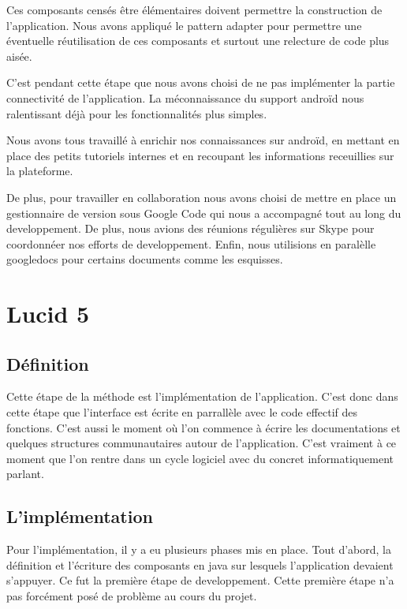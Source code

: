 \documentclass[11pt,a4paper]{article}
\begin{document}
Ces composants censés être élémentaires doivent permettre la construction de
l'application. Nous avons appliqué le pattern adapter pour permettre
une éventuelle réutilisation de ces composants et surtout une relecture de code
plus aisée.

C'est pendant cette étape que nous avons choisi de ne pas implémenter la partie
connectivité de l'application. La méconnaissance du support androïd nous
ralentissant déjà pour les fonctionnalités plus simples.

Nous avons tous travaillé à enrichir nos connaissances sur androïd, en mettant
en place des petits tutoriels internes et en recoupant les informations
receuillies sur la plateforme.

De plus, pour travailler en collaboration nous avons choisi de mettre en place
un gestionnaire de version sous Google Code qui nous a accompagné tout au long
du developpement. De plus, nous avions des réunions régulières sur Skype pour
coordonnéer nos efforts de developpement. Enfin, nous utilisions en paralèlle
googledocs pour certains documents comme les esquisses.


\section{Lucid 5}

\subsection{Définition}

Cette étape de la méthode est l'implémentation de l'application. C'est donc dans
cette étape que l'interface est écrite en parrallèle avec le code effectif des
fonctions. C'est aussi le moment où l'on commence à écrire les documentations et
quelques structures communautaires autour de l'application. C'est vraiment à ce
moment que l'on rentre dans un cycle logiciel avec du concret informatiquement
parlant.

\subsection{L'implémentation}

Pour l'implémentation, il y a eu plusieurs phases mis en place. Tout d'abord, la
définition et l'écriture des composants en java sur lesquels l'application
devaient s'appuyer. Ce fut la première étape de developpement. Cette première
étape n'a pas forcément posé de problème au cours du projet.
\end{document}
